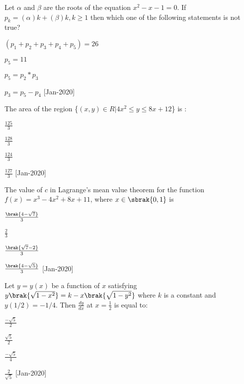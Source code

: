 \iffalse
\title{Assignment}
\author{EE24BTECH11051}
\section{mcq-single}
\fi



\item Let $\alpha$ and $\beta$ are the roots of the equation $x^2-x-1=0$. If $p_k = (\alpha)k + (\beta)k, k\geq1$ then which one of the following statements is not true?
     \item $(p_1 + p_2 + p_3 + p_4 + p_5) = 26$
     \item $ p_5 = 11$
     \item $p_5 = p_2 * p_3$
     \item $p_3=p_5-p_4$
 \hfill [Jan-2020]


\item The area of the region \{$(x, y)\in R | 4x^2 \leq y \leq 8x + 12$\} is :
     \item $\frac{125}{3}$
     \item $\frac{128}{3}$
     \item $\frac{124}{3}$
     \item $\frac{127}{3}$
  \hfill [Jan-2020]

\item The value of $c$ in Lagrange's mean value theorem for the function $f(x) = x^3-4x^2+8x+11$, where $x \in \sbrak{0,1}$ is
     \item $\frac{\brak{4-\sqrt{7}}}{3}$
     \item $\frac{2}{3}$
     \item $\frac{\brak{\sqrt{7}-2}}{3}$
     \item $\frac{\brak{4-\sqrt{5}}}{3}$
  \hfill [Jan-2020]

\item  Let $y = y(x)$ be a function of $x$ satisfying $y\brak{\sqrt{1-x^2}}=k-x\brak{\sqrt{1-y^2}}$ where $k$ is a constant and $y(1/2) = -1/4$. Then $\frac{dy}{dx}$ at $x=\frac{1}{2}$ is equal to:
     \item $\frac{-\sqrt{5}}{2}$
     \item $\frac{\sqrt{5}}{2}$
     \item $\frac{-\sqrt{5}}{4}$
     \item $\frac{2}{\sqrt{5}}$
  \hfill [Jan-2020]


